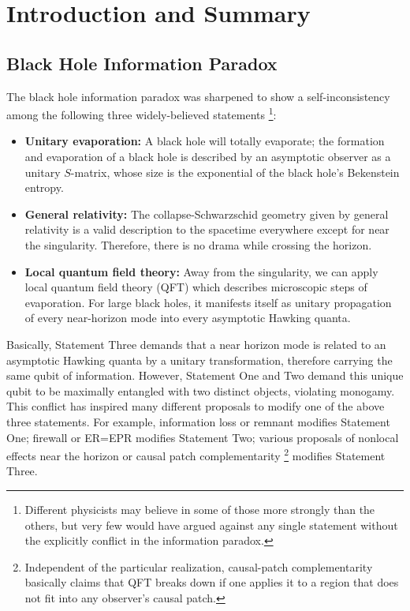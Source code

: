 \documentclass[aps,showpacs,onecolumn,floats,prd,superscriptaddress,nofootinbib]{revtex4-1}
\begin{document}
\maketitle


\section{Introduction and Summary}

\subsection{Black Hole Information Paradox}

The black hole information paradox \cite{Haw76a} was sharpened to show a self-inconsistency among the following three widely-believed statements \cite{AMPS}
\footnote{Different physicists may believe in some of those more strongly than the others, but very few would have argued against any single statement without the explicitly conflict in the information paradox.}:
\begin{itemize}
\item {\bf Unitary evaporation:} A black hole will totally evaporate; the formation and evaporation of a black hole is described by an asymptotic observer as a unitary $S$-matrix, whose size is the exponential of the black hole's Bekenstein entropy.
\item {\bf General relativity:} The collapse-Schwarzschid geometry given by general relativity is a valid description to the spacetime everywhere except for near the singularity.
Therefore, there is no drama while crossing the horizon.
\item {\bf Local quantum field theory:} Away from the singularity, we can apply local quantum field theory (QFT) which describes microscopic steps of evaporation. 
For large black holes, it manifests itself as unitary propagation of every near-horizon mode into every asymptotic Hawking quanta.
\end{itemize}
Basically, Statement Three demands that a near horizon mode is related to an asymptotic Hawking quanta by a unitary transformation, therefore carrying the same qubit of information. 
However, Statement One and Two demand this unique qubit to be maximally entangled with two distinct objects, violating monogamy. 
This conflict has inspired many different proposals to modify one of the above three statements. 
For example, information loss or remnant \cite{Bek94} modifies Statement One; 
firewall \cite{BraPir09,AMPS} or ER=EPR \cite{MalSus13} modifies Statement Two;
various proposals of nonlocal effects near the horizon \cite{Gid12,DodSil15,OsuPag16} or causal patch complementarity \cite{HuiYan13,IlgYan13,LowTho14}
\footnote{Independent of the particular realization, causal-patch complementarity basically claims that QFT breaks down if one applies it to a region that does not fit into any observer's causal patch.} 
modifies Statement Three.
\end{document}
